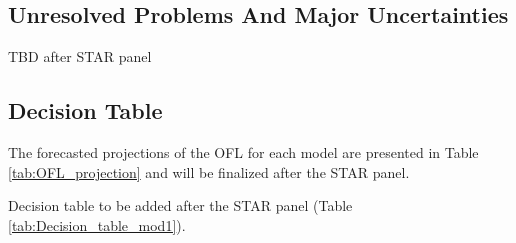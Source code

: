 \documentclass[12pt,]{article}
\begin{document}
\subsection*{Unresolved Problems And Major
Uncertainties}\label{unresolved-problems-and-major-uncertainties}

TBD after STAR panel

\FloatBarrier

\subsection*{Decision Table}\label{decision-table}

The forecasted projections of the OFL for each model are presented in
Table \ref{tab:OFL_projection} and will be finalized after the STAR
panel.

Decision table to be added after the STAR panel (Table
\ref{tab:Decision_table_mod1}).
\end{document}
